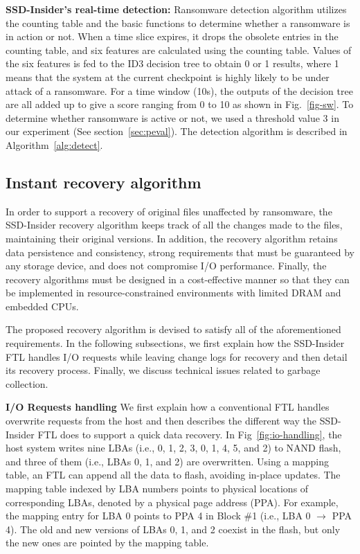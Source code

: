 \documentclass[conference]{IEEEtran}
\newcommand{\ours}{SSD-Insider}
\begin{document}
{\bf\noindent \ours{}'s real-time detection:} Ransomware detection algorithm utilizes
the counting table and the basic functions to determine whether a ransomware is in action or not. 
When a time slice expires, it drops the obsolete entries in the counting table, 
and six features are calculated using the counting table. 
Values of the six features is fed to the ID3 decision tree to obtain 0 or 1 results,
where 1 means that the system at the current checkpoint is highly likely to be under attack
of a ransomware. For a time window (10s), the outputs of the decision tree are all added up to 
give a score ranging from 0 to 10 as shown in Fig.~\ref{fig-sw}. 
To determine whether ransomware is active or not, we used
a threshold value 3 in our experiment (See section~\ref{sec:peval}).
The detection algorithm is described in Algorithm~\ref{alg:detect}.



\subsection{Instant recovery algorithm}

\label{sec:recovery}
In order to support a recovery of original files unaffected by
ransomware, the \ours{} recovery algorithm keeps track of all
the changes made to the files, maintaining their original versions.
In addition, the recovery algorithm retains data persistence and
consistency, strong requirements that must be guaranteed by any
storage device, and does not compromise I/O performance.  Finally,
the recovery algorithms must be designed in a cost-effective manner
so that they can be implemented in resource-constrained
environments with limited DRAM and embedded CPUs.  

The proposed recovery algorithm is devised to satisfy all of the
aforementioned requirements.  In the following subsections, we
first explain how the \ours{} FTL handles I/O requests while
leaving change logs for recovery and then detail its recovery
process.  Finally, we discuss technical issues related to garbage
collection.


{\noindent\bf I/O Requests handling} 
We first explain how a conventional FTL handles overwrite requests from the
host and then describes the different way the SSD-Insider FTL does to support a
quick data recovery.  In Fig~\ref{fig:io-handling}, the host system writes nine
LBAs (i.e., 0, 1, 2, 3, 0, 1, 4, 5, and 2) to NAND flash, and three of them
(i.e., LBAs 0, 1, and 2) are overwritten.  Using a mapping table, an FTL can
append all the data to flash, avoiding in-place updates. The mapping table
indexed by LBA numbers points to physical locations of corresponding LBAs,
denoted by a physical page address (PPA). For example, the mapping entry for
LBA 0 points to PPA 4 in Block \#1 (i.e., LBA 0 $\rightarrow$ PPA 4).  The old
and new versions of LBAs 0, 1, and 2 coexist in the flash, but only the new
ones are pointed by the mapping table. 
\end{document}
